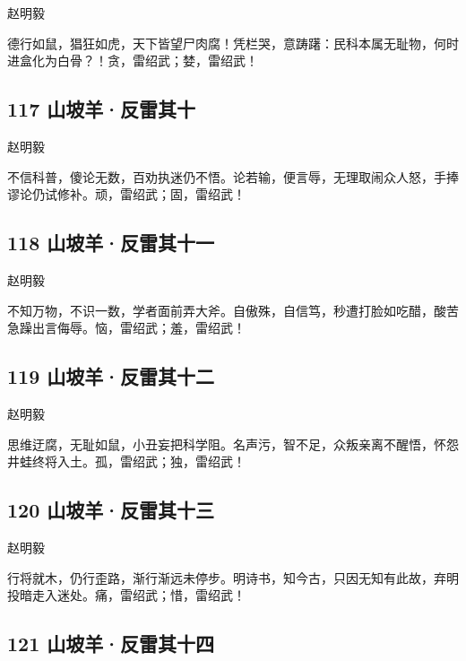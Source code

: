 {赵明毅}

德行如鼠，猖狂如虎，天下皆望尸肉腐！凭栏哭，意踌躇：民科本属无耻物，何时进盒化为白骨？！贪，雷绍武；婪，雷绍武！
~\\

\hypertarget{ux5c71ux5761ux7f8aux53cdux96f7ux5176ux5341}{%
\subsection{117
山坡羊·反雷其十}\label{ux5c71ux5761ux7f8aux53cdux96f7ux5176ux5341}}

{赵明毅}

不信科普，傻论无数，百劝执迷仍不悟。论若输，便言辱，无理取闹众人怒，手捧谬论仍试修补。顽，雷绍武；固，雷绍武！

\hypertarget{ux5c71ux5761ux7f8aux53cdux96f7ux5176ux5341ux4e00}{%
\subsection{118
山坡羊·反雷其十一}\label{ux5c71ux5761ux7f8aux53cdux96f7ux5176ux5341ux4e00}}

{赵明毅}

不知万物，不识一数，学者面前弄大斧。自傲殊，自信笃，秒遭打脸如吃醋，酸苦急躁出言侮辱。恼，雷绍武；羞，雷绍武！
~\\

\hypertarget{ux5c71ux5761ux7f8aux53cdux96f7ux5176ux5341ux4e8c}{%
\subsection{119
山坡羊·反雷其十二}\label{ux5c71ux5761ux7f8aux53cdux96f7ux5176ux5341ux4e8c}}

{赵明毅}

思维迂腐，无耻如鼠，小丑妄把科学阻。名声污，智不足，众叛亲离不醒悟，怀怨井蛙终将入土。孤，雷绍武；独，雷绍武！
~\\

\hypertarget{ux5c71ux5761ux7f8aux53cdux96f7ux5176ux5341ux4e09}{%
\subsection{120
山坡羊·反雷其十三}\label{ux5c71ux5761ux7f8aux53cdux96f7ux5176ux5341ux4e09}}

{ 赵明毅}

行将就木，仍行歪路，渐行渐远未停步。明诗书，知今古，只因无知有此故，弃明投暗走入迷处。痛，雷绍武；惜，雷绍武！

\hypertarget{ux5c71ux5761ux7f8aux53cdux96f7ux5176ux5341ux56db}{%
\subsection{121
山坡羊·反雷其十四}\label{ux5c71ux5761ux7f8aux53cdux96f7ux5176ux5341ux56db}}

